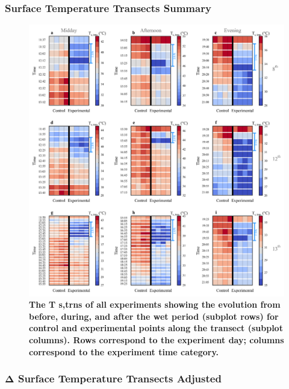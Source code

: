 \documentclass[final,3p,times,authoryear]{elsarticle}
\begin{document}
{\subsubsection{Surface Temperature Transects Summary}\label{sec:appendix7.5.8}

\begin{figure}
\centering
\includegraphics[trim={0 0 0 0},clip,scale=1.0]{pict044.png}
\caption{\bf The T s,trns of all experiments showing the evolution from before, during, and after the wet
period (subplot rows) for control and experimental points along the transect (subplot columns). Rows
correspond to the experiment day; columns correspond to the experiment time category.}
 \label{fig:7.15}
\end{figure}


\subsubsection{Δ Surface Temperature Transects Adjusted}\label{sec:appendix7.5.9}

}
\end{document}
